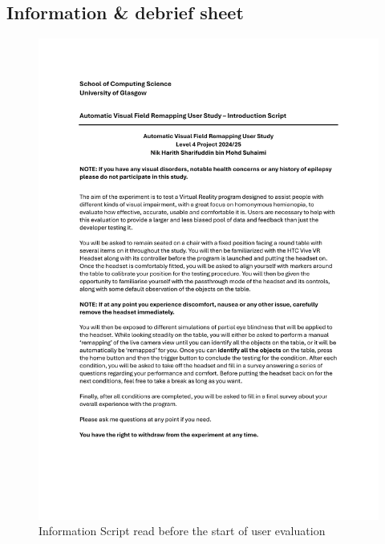\documentclass{l4proj}
\begin{document}
\begin{appendices}
\subsection{Information \& debrief sheet}
\begin{figure}[htbp]
    \centering
    \includegraphics[width=1\linewidth]{appendix/Information Script.pdf}    
    \caption{Information Script read before the start of user evaluation}
    \label{appx:infoSheet}
\end{figure}
\newpage


\end{appendices}
\end{document}
